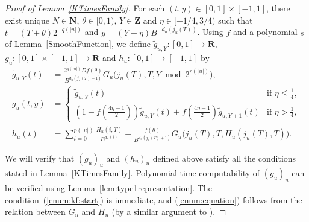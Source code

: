 \documentclass{lmcs}
\theoremstyle{definition}
\theoremstyle{remark}
\newcommand{\R}{\mathbf R}
\newcommand{\N}{\mathbf N}
\newcommand{\Z}{\mathbf Z}
\newcommand{\D}{D}
\begin{document}
\begin{proof}[Proof of Lemma~\ref{KTimesFamily}]
For each $(t, y) \in [0,1] \times [-1, 1]$,
there exist unique $N \in \N$, $\theta \in [0,1)$, $Y \in \Z$ and $\eta \in [-1/4, 3/4)$
such that $t = (T + \theta)2^{-q(|u|)}$ and $y = (Y + \eta)B^{-d_u(j_u(T))}$.
Using $f$ and a polynomial $s$ of Lemma~\ref{SmoothFunction},
we define 
$\tilde g_{u,Y} \colon [0,1] \to \R$,
$
g _u \colon [0, 1] \times [-1, 1] \to \R
$ and $
h _u \colon [0, 1] \to [-1, 1]
$ by
  \begin{align}
    \label{eq:delta}
   \tilde g_{u, Y} (t) &= \frac{2^{q(|u|)} \D f(\theta)}{B^{d_u(j_u(T)+1)}} 
   G_u \bigl( j_u(T), T, Y \bmod 2^{r(|u|)} \bigr),
   \\
  \label{eq:gu}
  g_u(t,y) 
  &= \begin{cases}
     \tilde g_{u, Y}(t)
     & \text{if } \eta \le \frac{1}{4}, 
     \\
     ( 1-f ( \frac{4\eta-1}{2})) \tilde g_{u, Y}(t)
     + f ( \frac{4\eta-1}{2}) \tilde g_{u,Y+1}(t)
     & \text{if } \eta > \frac{1}{4},
    \end{cases}
   \\
  h_u(t) 
   &= \sum^{p(|u|)}_{i=0} \frac{H_u(i, T)}{B^{d_u(i)}}  
  + \frac{f(\theta)}{B^{d_u(j_u(T)+1)}} G_u \bigl( j_u(T), T, H_u(j_u(T), T) \bigr).
  \label{eq:hu}
  \end{align}

We will verify that $(g_u)_u$ and $(h_u)_u$ defined above satisfy all the conditions stated in Lemma~\ref{KTimesFamily}.
Polynomial-time computability of $(g_u)_u$ can be verified using Lemma~\ref{lem:type1representation}.
The condition~(\ref{enum:kf:start}) is immediate, 
and (\ref{enum:equation}) follows from the relation between $G _u$ and $H _u$ 
(by a similar argument to \cite[Lemma 4.1]{kawamura2010lipschitz}).


\end{proof}
\end{document}
